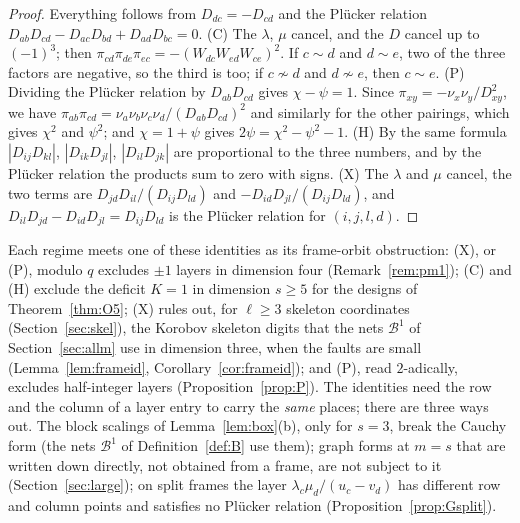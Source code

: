 \documentclass[11pt]{amsart}
\theoremstyle{definition}
\theoremstyle{plain}
\begin{document}
\begin{proof}
Everything follows from $D_{dc}=-D_{cd}$ and the Pl\"ucker relation $D_{ab}D_{cd}-D_{ac}D_{bd}+D_{ad}D_{bc}=0$. (C) The $\lambda$, $\mu$ cancel, and the $D$ cancel up to $(-1)^3$; then $\pi_{cd}\pi_{de}\pi_{ec}=-(W_{dc}W_{ed}W_{ce})^2$. If $c\sim d$ and $d\sim e$, two of the three factors are negative, so the third is too; if $c\not\sim d$ and $d\not\sim e$, then $c\sim e$. (P) Dividing the Pl\"ucker relation by $D_{ab}D_{cd}$ gives $\chi-\psi=1$. Since $\pi_{xy}=-\nu_x\nu_y/D_{xy}^2$, we have $\pi_{ab}\pi_{cd}=\nu_a\nu_b\nu_c\nu_d/(D_{ab}D_{cd})^2$ and similarly for the other pairings, which gives $\chi^2$ and $\psi^2$; and $\chi=1+\psi$ gives $2\psi=\chi^2-\psi^2-1$. (H) By the same formula $|D_{ij}D_{kl}|$, $|D_{ik}D_{jl}|$, $|D_{il}D_{jk}|$ are proportional to the three numbers, and by the Pl\"ucker relation the products sum to zero with signs. (X) The $\lambda$ and $\mu$ cancel, the two terms are $D_{jd}D_{il}/(D_{ij}D_{ld})$ and $-D_{id}D_{jl}/(D_{ij}D_{ld})$, and $D_{il}D_{jd}-D_{id}D_{jl}=D_{ij}D_{ld}$ is the Pl\"ucker relation for $(i,j,l,d)$.
\end{proof}

Each regime meets one of these identities as its frame-orbit obstruction: (X), or (P), modulo $q$ excludes $\pm1$ layers in dimension four (Remark~\ref{rem:pm1}); (C) and (H) exclude the deficit $K=1$ in dimension $s\ge5$ for the designs of Theorem~\ref{thm:O5}; (X) rules out, for $\ell\ge3$ skeleton coordinates (Section~\ref{sec:skel}), the Korobov skeleton digits that the nets $\mathcal B^1$ of Section~\ref{sec:allm} use in dimension three, when the faults are small (Lemma~\ref{lem:frameid}, Corollary~\ref{cor:frameid}); and (P), read $2$-adically, excludes half-integer layers (Proposition~\ref{prop:P}). The identities need the row and the column of a layer entry to carry the \emph{same} places; there are three ways out. The block scalings of Lemma~\ref{lem:box}(b), only for $s=3$, break the Cauchy form (the nets $\mathcal B^1$ of Definition~\ref{def:B} use them); graph forms at $m=s$ that are written down directly, not obtained from a frame, are not subject to it (Section~\ref{sec:large}); on split frames the layer $\lambda_c\mu_d/(u_c-v_d)$ has different row and column points and satisfies no Pl\"ucker relation (Proposition~\ref{prop:Gsplit}).
\end{document}
